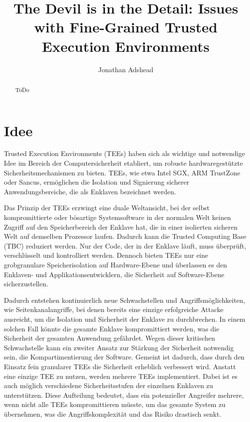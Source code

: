 \documentclass[sigconf]{acmart}
\title{The Devil is in the Detail: Issues with Fine-Grained Trusted Execution Environments}
\author{Jonathan Adshead}
\begin{document}
\begin{abstract}
ToDo
\end{abstract}

\maketitle  %

\section{Idee}
Trusted Execution Environments (TEEs) haben sich als wichtige und notwendige Idee im Bereich der Computersicherheit etabliert, um robuste hardwaregestützte Sicherheitsmechanismen zu bieten. TEEs, wie etwa Intel SGX, ARM TrustZone oder Sancus, ermöglichen die Isolation und Signierung sicherer Anwendungsbereiche, die als Enklaven bezeichnet werden. 

Das Prinzip der TEEs erzwingt eine duale Weltansicht, bei der selbst kompromittierte oder bösartige Systemsoftware in der normalen Welt keinen Zugriff auf den Speicherbereich der Enklave hat, die in einer isolierten sicheren Welt auf demselben Prozessor laufen. Dadurch kann die Trusted Computing Base (TBC) reduziert werden. Nur der Code, der in der Enklave läuft, muss überprüft, verschlüsselt und kontrolliert werden. Dennoch bieten TEEs nur eine grobgranulare Speicherisolation auf Hardware-Ebene und überlassen es den Enklaven- und Applikationsentwicklern, die Sicherheit auf Software-Ebene sicherzustellen. 

Dadurch entstehen kontinuierlich neue Schwachstellen und Angriffsmöglichkeiten, wie Seitenkanalangriffe, bei denen bereits eine einzige erfolgreiche Attacke ausreicht, um die Isolation und Sicherheit der Enklave zu durchbrechen. In einem solchen Fall könnte die gesamte Enklave kompromittiert werden, was die Sicherheit der gesamten Anwendung gefährdet. Wegen dieser kritischen Schwachstelle kann ein zweiter Ansatz zur Stärkung der Sicherheit notwendig sein, die Kompartimentierung der Software. Gemeint ist dadurch, dass durch den Einsatz fein granularer TEEs die Sicherheit erheblich verbessert wird. Anstatt eine einzige TEE zu nutzen, werden mehrere TEEs implementiert. Dabei ist es auch möglich verschiedene Sicherheitsstufen der einzelnen Enklaven zu unterstützen. Diese Aufteilung bedeutet, dass ein potenzieller Angreifer mehrere, wenn nicht alle TEEs kompromittieren müsste, um das gesamte System zu übernehmen, was die Angriffskomplexität und das Risiko drastisch senkt.
\end{document}
